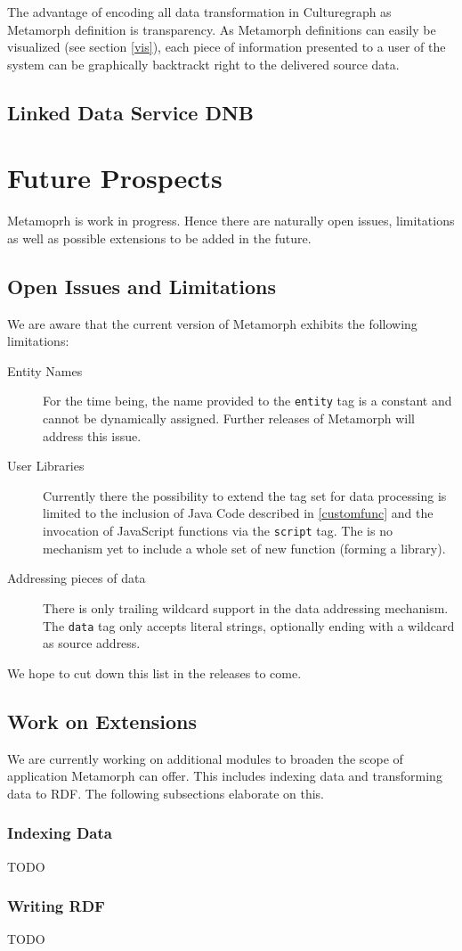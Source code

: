 \documentclass[12pt,a4paper]{article}
\begin{document}
The advantage of encoding all data transformation in Culturegraph as Metamorph definition is transparency. As Metamorph definitions can easily be visualized (see section \ref{vis}), each piece of information presented to a user of the system can be graphically backtrackt right to the delivered source data.


\subsection{Linked Data Service DNB}



\section{Future Prospects}
Metamoprh is work in progress. Hence there are naturally open issues, limitations as well as possible extensions to be added in the future. 

\subsection{Open Issues and Limitations}

We are aware that the current version of Metamorph exhibits the following limitations:

\begin{description}
\item[Entity Names]  For the time being, the name provided to the {\tt entity} tag is a constant and cannot be dynamically assigned. Further releases of Metamorph will address this issue.
\item[User Libraries] Currently there the possibility to extend the tag set for data processing is limited to the inclusion of Java Code described in \ref{customfunc} and the invocation of JavaScript functions via the {\tt script} tag. The is no mechanism yet to include a whole set of new function (forming a library).
\item[Addressing pieces of data] There is only trailing wildcard support in the data addressing mechanism. The {\tt data} tag only accepts literal strings, optionally ending with a wildcard as source address.
\end{description}
We hope to cut down this list in the releases to come.

\subsection{Work on Extensions}
We are currently working on additional modules to broaden the scope of application Metamorph can offer.
This includes indexing data and transforming data to RDF. The following subsections elaborate on this.

\subsubsection{Indexing Data}
TODO

\subsubsection{Writing RDF}
TODO
\end{document}
